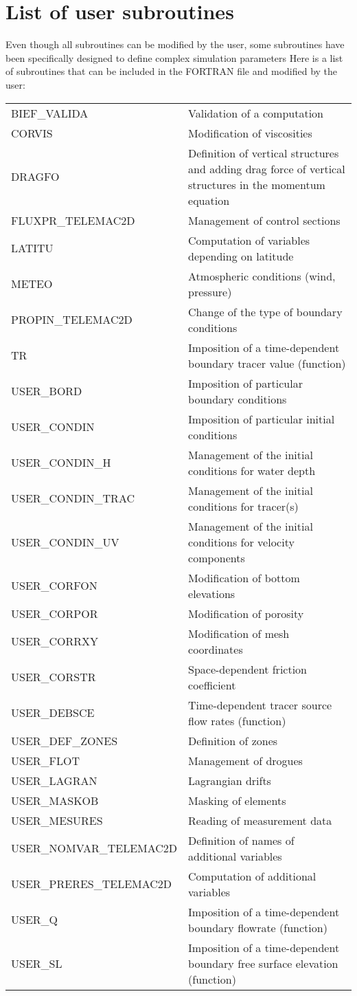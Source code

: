 \chapter{List of user subroutines}
\label{tel2d:app2}
Even though all subroutines can be modified by the user, some subroutines have
been specifically designed to define complex simulation parameters
Here is a list of subroutines that can be included in the FORTRAN file
and modified by the user:\\
\begin{tabular}{p{}p{4.0in}}
BIEF\_VALIDA & Validation of a computation\\
CORVIS & Modification of viscosities\\
DRAGFO & Definition of vertical structures and adding drag force of vertical structures in the momentum equation\\
FLUXPR\_TELEMAC2D & Management of control sections\\
LATITU & Computation of variables depending on latitude\\
METEO  & Atmospheric conditions (wind, pressure)\\
PROPIN\_TELEMAC2D & Change of the type of boundary conditions\\
TR & Imposition of a time-dependent boundary tracer value (function)\\
USER\_BORD   & Imposition of particular boundary conditions\\
USER\_CONDIN & Imposition of particular initial conditions\\
USER\_CONDIN\_H & Management of the initial conditions for water depth\\
USER\_CONDIN\_TRAC & Management of the initial conditions for tracer(s)\\
USER\_CONDIN\_UV & Management of the initial conditions for velocity components\\
USER\_CORFON & Modification of bottom elevations\\
USER\_CORPOR & Modification of porosity\\
USER\_CORRXY & Modification of mesh coordinates\\
USER\_CORSTR & Space-dependent friction coefficient\\
USER\_DEBSCE & Time-dependent tracer source flow rates (function)\\
USER\_DEF\_ZONES & Definition of zones\\
USER\_FLOT  & Management of drogues\\
USER\_LAGRAN & Lagrangian drifts\\
USER\_MASKOB & Masking of elements\\
USER\_MESURES & Reading of measurement data\\
USER\_NOMVAR\_TELEMAC2D & Definition of names of additional variables\\
USER\_PRERES\_TELEMAC2D & Computation of additional variables\\
USER\_Q     & Imposition of a time-dependent boundary flowrate (function)\\
USER\_SL    & Imposition of a time-dependent boundary free surface elevation (function)\\
\end{tabular}
